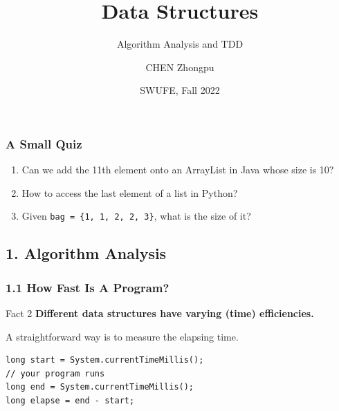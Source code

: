\documentclass[aspectratio=169, 14pt]{beamer}
\title[Data Structures] %
{Data Structures}
\subtitle{Algorithm Analysis and TDD}
\author[CHEN Zhongpu] %
{CHEN Zhongpu}
\institute[] %
{
  School of Computing and Artificial Intelligence \\
  \href{mailto:zpchen@swufe.edu.cn}{zpchen@swufe.edu.cn}
}
\date[] %
{SWUFE, Fall 2022}
\begin{document}
\frame{\titlepage}

\begin{frame}
    \frametitle{A Small Quiz}
    \begin{enumerate}
        \item<1->  Can we add the 11th element onto an \alert{ArrayList} in Java whose size is 10?
        \item<2->  How to access the last element of a 
        \alert{list} in Python?
        \item<3->  Given \texttt{bag = \{1, 1, 2, 2, 3\}}, what is the size of it?
    \end{enumerate}
\end{frame}

{
    \begin{frame}
        \section{\textcolor{darkmidnightblue}{1. Algorithm Analysis}}
    \end{frame}
}
\begin{frame}[fragile]
    \frametitle{1.1 How Fast Is A Program?}
    \begin{block}{Fact 2}
        \textbf{Different data structures have varying (time) \alert{efficiencies}.}
    \end{block} 
A straightforward way is to measure the elapsing time.
\begin{verbatim}
long start = System.currentTimeMillis();
// your program runs
long end = System.currentTimeMillis();
long elapse = end - start;    
\end{verbatim}
\end{frame}
\end{document}
